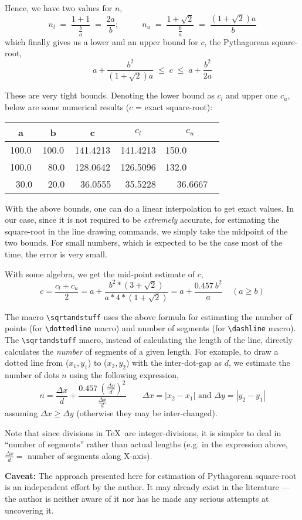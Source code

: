 Hence, we have two values for $n$,
\[ n_l\;=\; \frac{1+1}{\frac{b}{a}} \;=\; \frac{2a}{b};\;\;\;\;\;\;\;\;\;\;
n_u \;=\; \frac{1+ \sqrt{2}}{\frac{b}{a}} \;=\; \frac{(1+ \sqrt{2})a}{b}
\]
%
which finally gives us a lower and an upper bound for $c$, the Pythagorean
square-root,
\[ a + \frac{b^2}{(1+ \sqrt{2})a} \;\le\; c \;\le\; a + \frac{b^2}{2a}\]

These are very tight bounds. Denoting the lower bound as $c_l$ and upper
one $c_u$, below are some numerical results ($c$ = exact square-root):

\begin{center}
\begin{tabular}{|c|c|c|c|c|}
\hline
a & b & c & $c_l$ & $c_u$\\
\hline
100.0 & 100.0 & 141.4213 & 141.4213 & 150.0\ \ \ \ \ \ \\
100.0 & \ \,80.0  & 128.0642 & 126.5096 & 132.0\ \ \ \ \ \  \\
\ \,30.0  & \ \,20.0  & \ \,36.0555  & \ 35.5228  & \ 36.6667 \\
\hline
\end{tabular}
\end{center}

With the above bounds, one can do a linear interpolation to get exact values.
In our case, since it is not required to be {\it extremely\/} accurate, for 
estimating the square-root in the line drawing commands,
we simply take the midpoint of the two bounds. For small
numbers, which is expected to be the case most of the time,
the error is very small.

With some algebra, we get the mid-point estimate of $c$,
\[c = \frac{c_l+c_u}{2} = a + \frac{b^2 * (3 + \sqrt{2})}{a*4*(1 + \sqrt{2})}
= a + \frac{0.457\: b^2}{a} \;\;\;\;(a \ge b) \]

The macro \verb|\sqrtandstuff| uses the above formula for estimating the
number of points (for \verb|\dottedline| macro) and number of segments (for
\verb|\dashline| macro). The \verb|\sqrtandstuff| macro, instead of
calculating the length of the line, directly calculates the {\it number\/} of
segments of a given length. For example, to draw a dotted line from
($x_1,y_1$) to ($x_2,y_2$) with the inter-dot-gap as $d$, we estimate the
number of dots $n$ using the following expression,
\[ n= \frac{\Delta x}{d} + 
\frac{0.457\:(\frac{\Delta y}{d})^2}{\frac{\Delta x}{d}} \;\;\;\;\;\;\;
\Delta x = |x_2 - x_1| \mbox{ and } \Delta y = |y_2 - y_1|\]
assuming $\Delta x \ge \Delta y$ (otherwise they may be inter-changed).

Note that since divisions in \TeX\ are integer-divisions, it is simpler to
deal in ``number of segments'' rather than actual lengths
(e.g. in the expression above, $\frac{\Delta x}{d} = $ number of segments
along X-axis).

\noindent
{\bf Caveat:} The approach presented here for estimation of
Pythagorean square-root is an independent effort by the author. It may
already exist in the literature --- the author is neither aware of it nor has
he made any serious attempts at uncovering it.
